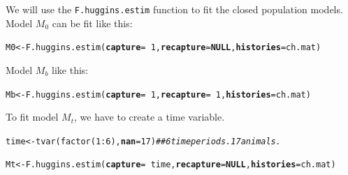 \documentclass[12pt]{article}\usepackage[]{graphicx}\usepackage[]{color}
\makeatletter
\newcommand{\hlnum}[1]{\textcolor[rgb]{0.69,0.494,0}{#1}}%
\newcommand{\hlcom}[1]{\textcolor[rgb]{0.514,0.506,0.514}{\textit{#1}}}%
\newcommand{\hlopt}[1]{\textcolor[rgb]{0,0,0}{#1}}%
\newcommand{\hlstd}[1]{\textcolor[rgb]{0,0,0}{#1}}%
\newcommand{\hlkwa}[1]{\textcolor[rgb]{0,0,0}{\textbf{#1}}}%
\newcommand{\hlkwb}[1]{\textcolor[rgb]{0,0.341,0.682}{#1}}%
\newcommand{\hlkwc}[1]{\textcolor[rgb]{0,0,0}{\textbf{#1}}}%
\newcommand{\hlkwd}[1]{\textcolor[rgb]{0.004,0.004,0.506}{#1}}%
\newenvironment{kframe}{%
 \def\at@end@of@kframe{}%
 \ifinner\ifhmode%
  \def\at@end@of@kframe{\end{minipage}}%
  \begin{minipage}{\columnwidth}%
 \fi\fi%
 \def\FrameCommand##1{\hskip\@totalleftmargin \hskip-\fboxsep
 \colorbox{shadecolor}{##1}\hskip-\fboxsep
     \hskip-\linewidth \hskip-\@totalleftmargin \hskip\columnwidth}%
 \MakeFramed {\advance\hsize-\width
   \@totalleftmargin\z@ \linewidth\hsize
   \@setminipage}}%
 {\par\unskip\endMakeFramed%
 \at@end@of@kframe}
\newenvironment{knitrout}{}{} %
\newcommand{\inr}[1]{\colorbox{inlinecolor}{\texttt{#1}}}
\makeatother
\begin{document}
We will use the \inr{F.huggins.estim} function to fit the
closed population models. Model $M_0$ can be fit like this: 

\begin{knitrout}
\color{fgcolor}\begin{kframe}
\begin{alltt}
\hlstd{M0} \hlkwb{<-} \hlkwd{F.huggins.estim}\hlstd{(}\hlkwc{capture}\hlstd{=}\hlopt{~}\hlnum{1}\hlstd{,} \hlkwc{recapture}\hlstd{=}\hlkwa{NULL}\hlstd{,} \hlkwc{histories}\hlstd{=ch.mat)}
\end{alltt}


{\ttfamily\noindent\bfseries{}}\end{kframe}
\end{knitrout}

Model $M_b$ like this:

\begin{knitrout}
\color{fgcolor}\begin{kframe}
\begin{alltt}
\hlstd{Mb} \hlkwb{<-} \hlkwd{F.huggins.estim}\hlstd{(}\hlkwc{capture}\hlstd{=}\hlopt{~}\hlnum{1}\hlstd{,} \hlkwc{recapture}\hlstd{=}\hlopt{~}\hlnum{1}\hlstd{,} \hlkwc{histories}\hlstd{=ch.mat)}
\end{alltt}


{\ttfamily\noindent\bfseries{}}\end{kframe}
\end{knitrout}

To fit model $M_t$, we have to create a time variable.

\begin{knitrout}
\color{fgcolor}\begin{kframe}
\begin{alltt}
\hlstd{time} \hlkwb{<-} \hlkwd{tvar}\hlstd{(}\hlkwd{factor}\hlstd{(}\hlnum{1}\hlopt{:}\hlnum{6}\hlstd{),} \hlkwc{nan}\hlstd{=}\hlnum{17}\hlstd{)} \hlcom{## 6 time periods. 17 animals.}
\end{alltt}


{\ttfamily\noindent\bfseries{}}\begin{alltt}
\hlstd{Mt} \hlkwb{<-} \hlkwd{F.huggins.estim}\hlstd{(}\hlkwc{capture}\hlstd{=}\hlopt{~}\hlstd{time,} \hlkwc{recapture}\hlstd{=}\hlkwa{NULL}\hlstd{,} \hlkwc{histories}\hlstd{=ch.mat)}
\end{alltt}


{\ttfamily\noindent\bfseries{}}\end{kframe}
\end{knitrout}
\end{document}
